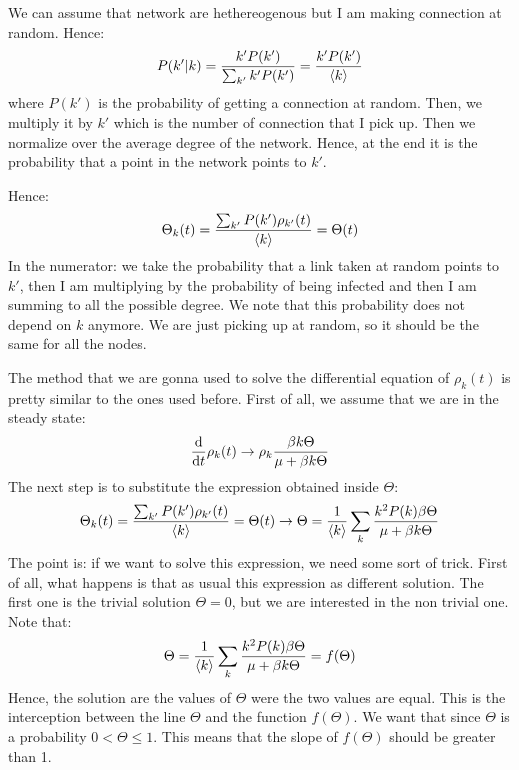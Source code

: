 \documentclass[../main/main.tex]{subfiles}
\begin{document}
We can assume that network are hethereogenous but I am making connection at random. Hence:
\begin{equation*}
  P(k'|k) = \frac{k'P(k')}{\sum_{k'}^{} k' P(k')  } = \frac{k'P(k')}{\expval{k}  }
\end{equation*}
where \( P(k') \) is the probability of getting a connection at random. Then, we multiply it by \( k' \) which is the number of connection that I pick up. Then we normalize over the average degree of the network.  Hence, at the end it is the probability that a point in the network points to \( k' \).

Hence:
\begin{equation*}
  \Theta _k (t) = \frac{\sum_{k'}^{} P(k') \rho _{k'} (t)  }{\expval{k} } = \Theta (t)
\end{equation*}
In the numerator: we take the probability that a link taken at random points to \( k' \), then I am multiplying by the probability of being infected and then I am summing to all the possible degree.
We note that this probability does not depend on \( k \) anymore. We are just picking up at random, so it should be the same for all the nodes.

The method that we are gonna used to solve the differential equation of \( \rho _k (t) \) is pretty similar to the ones used before. First of all, we assume that we are in the steady state:
\begin{equation*}
  \dv{}{t} \rho _k (t) \rightarrow  \rho _k \frac{\beta k \Theta }{\mu + \beta k \Theta }
\end{equation*}
The next step is to substitute the expression obtained inside \( \Theta  \):
\begin{equation*}
    \Theta _k (t) = \frac{\sum_{k'}^{} P(k') \rho _{k'} (t)  }{\expval{k} } = \Theta (t) \rightarrow  \Theta = \frac{1}{\expval{k} } \sum_{k}^{} \frac{k^2 P(k) \beta \Theta }{\mu + \beta k \Theta }
\end{equation*}
The point is: if we want to solve this expression, we need some sort of trick. First of all, what happens is that as usual this expression as different solution. The first one is the trivial solution \( \Theta =0 \), but we are interested in the non trivial one. Note that:
\begin{equation*}
   \Theta = \frac{1}{\expval{k} } \sum_{k}^{} \frac{k^2 P(k) \beta \Theta }{\mu + \beta k \Theta } = f(\Theta )
\end{equation*}
Hence, the solution are the values of \( \Theta  \) were the two values are equal. This is the interception between the line \( \Theta  \) and the function \( f(\Theta ) \). We want that since \( \Theta  \) is a probability \( 0<\Theta \le 1 \). This means that the slope of \( f(\Theta ) \) should be greater than 1.
\end{document}
